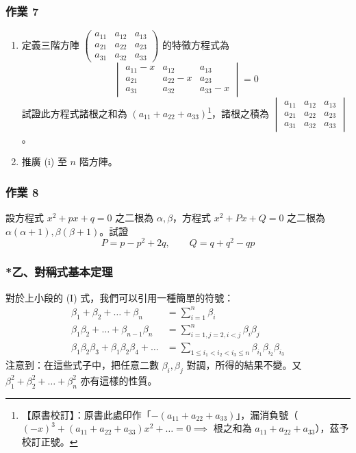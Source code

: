 \subsubsection*{作業 7}\label{hw:b6-2-7}
\begin{enumerate}[label=(\roman*), leftmargin=2em]
  \item 定義三階方陣 $\begin{pmatrix} a_{11} & a_{12} & a_{13} \\ a_{21} & a_{22} & a_{23} \\ a_{31} & a_{32} & a_{33} \end{pmatrix}$ 的特徵方程式為
  \[ \begin{vmatrix}
  a_{11}-x & a_{12} & a_{13} \\
  a_{21} & a_{22}-x & a_{23} \\
  a_{31} & a_{32} & a_{33}-x
  \end{vmatrix} = 0 \]
  試證此方程式諸根之和為 $(a_{11}+a_{22}+a_{33})$\label{note:b6-ch2-p95-trace}\footnote{【原書校訂】：原書此處印作「$-(a_{11}+a_{22}+a_{33})$」，漏消負號（$(-x)^3 + (a_{11}+a_{22}+a_{33})x^2 + \dots = 0 \implies$ 根之和為 $a_{11}+a_{22}+a_{33}$），茲予校訂正號。}，諸根之積為 $\begin{vmatrix} a_{11} & a_{12} & a_{13} \\ a_{21} & a_{22} & a_{23} \\ a_{31} & a_{32} & a_{33} \end{vmatrix}$。
  \item 推廣 (i) 至 $n$ 階方陣。
\end{enumerate}

\subsubsection*{作業 8}\label{hw:b6-2-8}
設方程式 $x^2+px+q=0$ 之二根為 $\alpha, \beta$，方程式 $x^2+Px+Q=0$ 之二根為 $\alpha(\alpha+1), \beta(\beta+1)$。試證
\[ P = p - p^2 + 2q, \qquad Q = q + q^2 - qp \]

\subsubsection*{*乙、對稱式基本定理}\label{subsec:b6-2-3-b}

對於上小段的 (I) 式，我們可以引用一種簡單的符號：
\begin{align*}
\beta_1+\beta_2+\dots+\beta_n &= \sum_{i=1}^n \beta_i \\
\beta_1\beta_2+\dots+\beta_{n-1}\beta_n &= \sum_{i=1, j=2, i<j}^n \beta_i \beta_j \\
\beta_1\beta_2\beta_3+\beta_1\beta_2\beta_4+\dots &= \sum_{1 \le i_1 < i_2 < i_3 \le n} \beta_{i_1}\beta_{i_2}\beta_{i_3}
\end{align*}
注意到：在這些式子中，把任意二數 $\beta_i, \beta_j$ 對調，所得的結果不變。又 $\beta_1^2+\beta_2^2+\dots+\beta_n^2$ 亦有這樣的性質。

